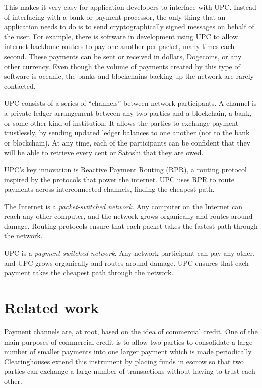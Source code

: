 \documentclass[a4paper]{article}
\begin{document}
This makes it very easy for application developers to interface with UPC. Instead of interfacing with a bank or payment processor, the only thing that an application needs to do is to send cryptographically signed messages on behalf of the user. For example, there is software in development using UPC to allow internet backbone routers to pay one another per-packet, many times each second. These payments can be sent or received in dollars, Dogecoins, or any other currency. Even though the volume of payments created by this type of software is oceanic, the banks and blockchains backing up the network are rarely contacted.

UPC consists of a series of ``channels'' between network participants. A channel is a private ledger arrangement between any two parties and a blockchain, a bank, or some other kind of institution. It allows the parties to exchange payment trustlessly, by sending updated ledger balances to one another (not to the bank or blockchain). At any time, each of the participants can be confident that they will be able to retrieve every cent or Satoshi that they are owed.

UPC's key innovation is Reactive Payment Routing (RPR), a routing protocol inspired by the protocols that power the internet. UPC uses RPR to route payments across interconnected channels, finding the cheapest path.

The Internet is a \emph{packet-switched network}. Any computer on the Internet can reach any other computer, and the network grows organically and routes around damage. Routing protocols ensure that each packet takes the fastest path through the network.

UPC is a \emph{payment-switched network}. Any network participant can pay any other, and UPC grows organically and routes around damage. UPC ensures that each payment takes the cheapest path through the network.

\section*{Related work}
Payment channels are, at root, based on the idea of commercial credit. One of the main purposes of commercial credit is to allow two parties to consolidate a large number of smaller payments into one larger payment which is made periodically. Clearinghouses extend this instrument by placing funds in escrow so that two parties can exchange a large number of transactions without having to trust each other.
\end{document}
